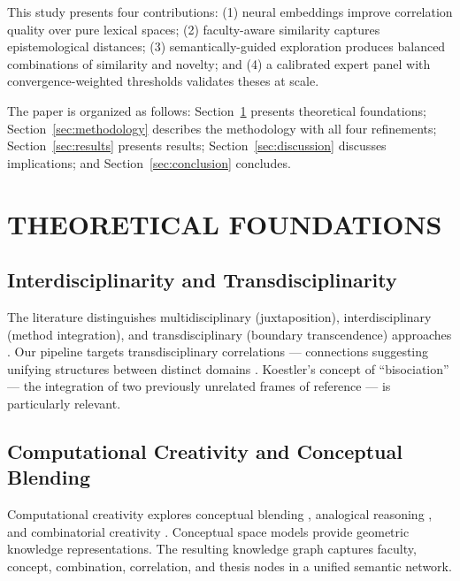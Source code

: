 \documentclass[a4paper,12pt]{article}
\begin{document}
This study presents four contributions: (1) neural embeddings improve correlation quality 
over pure lexical spaces; (2) faculty-aware similarity captures epistemological distances; 
(3) semantically-guided exploration produces balanced combinations of similarity and novelty; 
and (4) a calibrated expert panel with convergence-weighted thresholds validates theses 
at scale.

The paper is organized as follows: Section~\ref{sec:foundations} presents theoretical 
foundations; Section~\ref{sec:methodology} describes the methodology with all four 
refinements; Section~\ref{sec:results} presents results; Section~\ref{sec:discussion} 
discusses implications; and Section~\ref{sec:conclusion} concludes.


\section{THEORETICAL FOUNDATIONS}\label{sec:foundations}

\subsection{Interdisciplinarity and Transdisciplinarity}

The literature distinguishes multidisciplinary (juxtaposition), interdisciplinary (method 
integration), and transdisciplinary (boundary transcendence) approaches 
\cite{klein1990, nicolescu1996, bernstein2015}. Our pipeline targets transdisciplinary 
correlations --- connections suggesting unifying structures between distinct domains 
\cite{morin2000, piaget1972}. Koestler's \cite{koestler1964} concept of ``bisociation'' --- 
the integration of two previously unrelated frames of reference --- is particularly relevant.

\subsection{Computational Creativity and Conceptual Blending}

Computational creativity explores conceptual blending \cite{fauconnier2002, veale2012}, 
analogical reasoning \cite{hofstadter1995, gentner1983}, and combinatorial creativity 
\cite{boden2004}. Conceptual space models \cite{gardenfors2000, gardenfors2014} provide 
geometric knowledge representations. The resulting knowledge graph 
\cite{ehrlinger2016, paulheim2017} captures faculty, concept, combination, correlation, 
and thesis nodes in a unified semantic network.
\end{document}
